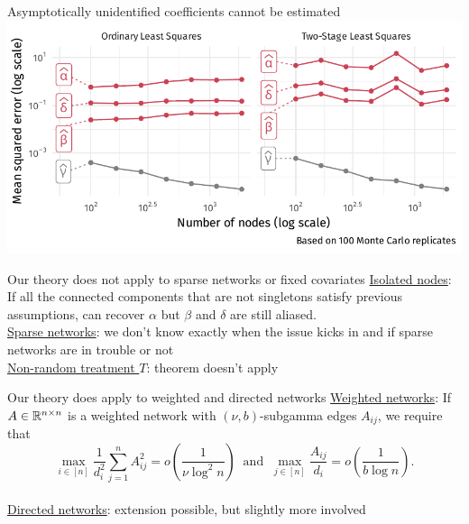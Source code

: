 \documentclass[aspectratio=169]{beamer}
\theoremstyle{remark}
\begin{document}
\begin{frame}{\textcolor{BrickRed}{Asymptotically unidentified} coefficients cannot be estimated}
    \vspace{3mm}
    \centering
    \includegraphics{./figures/simulations/defense-mse.pdf}
\end{frame}

\begin{frame}{Our theory does not apply to sparse networks or fixed covariates}
    \underline{Isolated nodes}: If all the connected components that are not singletons satisfy previous assumptions, can recover $\alpha$ but $\beta$ and $\delta$ are still aliased. \\
    \vspace{5mm}
    \underline{Sparse networks}: we don't know exactly when the issue kicks in and if sparse networks are in trouble or not \\
    \vspace{5mm}
    \underline{Non-random treatment $T$}: theorem doesn't apply
\end{frame}

\begin{frame}{Our theory does apply to weighted and directed networks}
    \underline{Weighted networks}: If $A \in \mathbb{R}^{n \times n}$ is a weighted network with $(\nu, b)$-subgamma edges $A_{ij}$, we require that
    \begin{equation*}
        \max_{i \in [n]} \frac{1}{d_i^2} \sum_{j=1}^n A_{ij}^2
        = o\left( \frac{ 1 }{ \nu \log^2 n } \right)
        ~\text{ and }~
        \max_{j \in [n]} \frac{ A_{ij} }{ d_i }
        = o\left( \frac{ 1 }{ b \log n } \right).
    \end{equation*} \\
    \vspace{5mm}
    \underline{Directed networks}: extension possible, but slightly more involved
\end{frame}
\end{document}
